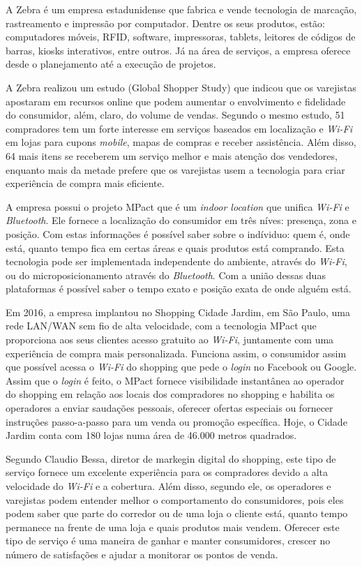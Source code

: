 A Zebra é um empresa estadunidense que fabrica e vende tecnologia de marcação,
rastreamento e impressão por computador. Dentre os seus produtos, estão:
computadores móveis, RFID, software, impressoras, tablets, leitores de códigos
de barras, kiosks interativos, entre outros. Já na área de serviços, a empresa
oferece desde o planejamento até a execução de projetos.

A Zebra realizou um estudo (Global Shopper Study) que indicou que os varejistas
apostaram em recursos online que podem aumentar o envolvimento e fidelidade do
consumidor, além, claro, do volume de vendas. Segundo o mesmo estudo, 51%
compradores tem um forte interesse em serviços baseados em localização e
\emph{Wi-Fi} em lojas para cupons \emph{mobile}, mapas de compras e receber
assistência. Além disso, 64%
mais itens se receberem um serviço melhor e mais atenção dos vendedores,
enquanto mais da metade prefere que os varejistas usem a tecnologia para criar
experiência de compra mais eficiente.

A empresa possui o projeto MPact que é um \emph{indoor location} que unifica
\emph{Wi-Fi} e \emph{Bluetooth}. Ele fornece a localização do consumidor em três
níves: presença, zona e posição. Com estas informações é possível saber sobre o
indíviduo: quem é, onde está, quanto tempo fica em certas áreas e quais
produtos está comprando. Esta tecnologia pode ser implementada independente do
ambiente, através do \emph{Wi-Fi}, ou do microposicionamento através do
\emph{Bluetooth}. Com a união dessas duas plataformas é possível saber o tempo
exato e posição exata de onde alguém está.

Em 2016, a empresa implantou no Shopping Cidade Jardim, em São Paulo, uma rede
LAN/WAN sem fio de alta velocidade, com a tecnologia MPact que proporciona aos
seus clientes acesso gratuito ao \emph{Wi-Fi}, juntamente com uma experiência de
compra mais personalizada. Funciona assim, o consumidor assim que possível
acessa o \emph{Wi-Fi} do shopping que pede o \emph{login} no Facebook ou Google. Assim
que o \emph{login} é feito, o MPact fornece visibilidade instantânea ao operador do
shopping em relação aos locais dos compradores no shopping e habilita os
operadores a enviar saudações pessoais, oferecer ofertas especiais ou fornecer
instruções passo-a-passo para um venda ou promoção específica. Hoje, o Cidade
Jardim conta com 180 lojas numa área de 46.000 metros quadrados.

Segundo Claudio Bessa, diretor de markegin digital do shopping, este tipo de
serviço fornece um excelente experiência para os compradores devido a alta
velocidade do \emph{Wi-Fi} e a cobertura. Além disso, segundo ele, os operadores
e varejistas podem entender melhor o comportamento do consumidores, pois eles
podem saber que parte do corredor ou de uma loja o cliente está, quanto tempo
permanece na frente de uma loja e quais produtos mais vendem. Oferecer este tipo
de serviço é uma maneira de ganhar e manter consumidores, crescer no número de
satisfações e ajudar a monitorar os pontos de venda.

